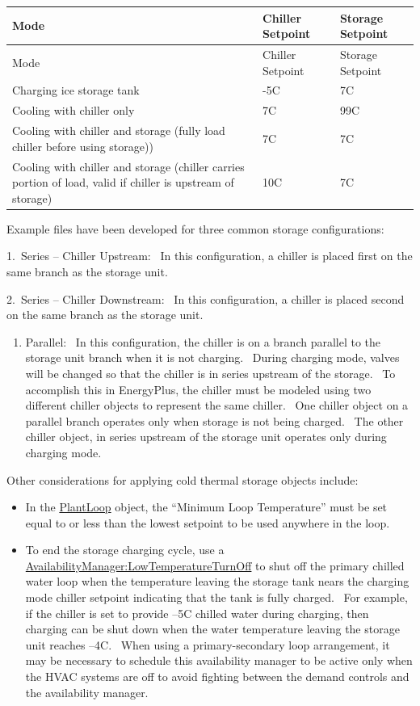 \begin{longtable}[c]{p{3.0in}p{1.5in}p{1.5in}}
\toprule
Mode & Chiller Setpoint & Storage Setpoint \tabularnewline
\midrule
\endfirsthead

\toprule
Mode & Chiller Setpoint & Storage Setpoint \tabularnewline
\midrule
\endhead

Charging ice storage tank & -5C & 7C \tabularnewline
Cooling with chiller only & 7C & 99C \tabularnewline
Cooling with chiller and storage (fully load chiller before using storage)) & 7C & 7C \tabularnewline
Cooling with chiller and storage (chiller carries portion of load, valid if chiller is upstream of storage) & 10C & 7C \tabularnewline
\bottomrule
\end{longtable}

Example files have been developed for three common storage configurations:

1.~Series -- Chiller Upstream:~ In this configuration, a chiller is placed first on the same branch as the storage unit.

2.~Series -- Chiller Downstream:~ In this configuration, a chiller is placed second on the same branch as the storage unit.

\begin{enumerate}
\def\labelenumi{\arabic{enumi}.}
\setcounter{enumi}{2}
\tightlist
\item
  Parallel:~ In this configuration, the chiller is on a branch parallel to the storage unit branch when it is not charging.~ During charging mode, valves will be changed so that the chiller is in series upstream of the storage.~ To accomplish this in EnergyPlus, the chiller must be modeled using two different chiller objects to represent the same chiller.~ One chiller object on a parallel branch operates only when storage is not being charged.~ The other chiller object, in series upstream of the storage unit operates only during charging mode.
\end{enumerate}

Other considerations for applying cold thermal storage objects include:

\begin{itemize}
\item
  In the \hyperref[plantloop]{PlantLoop} object, the ``Minimum Loop Temperature'' must be set equal to or less than the lowest setpoint to be used anywhere in the loop.
\item
  To end the storage charging cycle, use a \hyperref[availabilitymanagerlowtemperatureturnoff]{AvailabilityManager:LowTemperatureTurnOff} to shut off the primary chilled water loop when the temperature leaving the storage tank nears the charging mode chiller setpoint indicating that the tank is fully charged.~ For example, if the chiller is set to provide --5C chilled water during charging, then charging can be shut down when the water temperature leaving the storage unit reaches --4C.~ When using a primary-secondary loop arrangement, it may be necessary to schedule this availability manager to be active only when the HVAC systems are off to avoid fighting between the demand controls and the availability manager.
\end{itemize}

